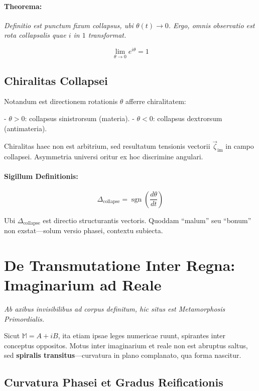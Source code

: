 \paragraph{Theorema:} \textit{Definitio est punctum fixum collapsus, ubi $\theta(t) \to 0$. Ergo, omnis observatio est rota collapsalis quae $i$ in $1$ transformat.}

\[
\lim_{\theta \to 0} e^{i\theta} = 1
\]

\subsection*{Chiralitas Collapsei}

Notandum est directionem rotationis $\theta$ afferre chiralitatem:

- $\theta > 0$: collapsus sinistrorsum (materia).
- $\theta < 0$: collapsus dextrorsum (antimateria).

Chiralitas haec non est arbitrium, sed resultatum tensionis vectorii $\vec{\zeta}_{\text{im}}$ in campo collapsei. Asymmetria universi oritur ex hoc discrimine angulari.

\paragraph{Sigillum Definitionis:}

\[
\Delta_{\text{collapse}} = \operatorname{sgn} \left( \frac{d\theta}{dt} \right)
\]

Ubi $\Delta_{\text{collapse}}$ est directio structurantis vectoris. Quoddam “malum” seu “bonum” non exstat—solum versio phasei, contextu subiecta.

\section*{De Transmutatione Inter Regna: Imaginarium ad Reale}

\textit{Ab axibus invisibilibus ad corpus definitum, hic situs est Metamorphosis Primordialis.}

Sicut $\mathbb{M} = A + iB$, ita etiam ipsae leges numericae ruunt, spirantes inter conceptus oppositos. Motus inter imaginarium et reale non est abruptus saltus, sed \textbf{spiralis transitus}—curvatura in plano complanato, qua forma nascitur.

\subsection*{Curvatura Phasei et Gradus Reificationis}

